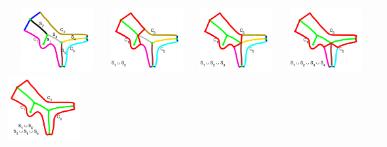 \begin{figure}[!ht]
\centering
{\footnotesize\textit{\textcolor{white}{a)}}}\includegraphics[width=0.17\textwidth]{figs/fish_s1.pdf}
{\footnotesize\textit{\textcolor{white}{a)}}}\includegraphics[width=0.17\textwidth]{figs/fish_s2.pdf}
{\footnotesize\textit{\textcolor{white}{a)}}}\includegraphics[width=0.17\textwidth]{figs/fish_s3.pdf}
{\footnotesize\textit{\textcolor{white}{a)}}}\includegraphics[width=0.17\textwidth]{figs/fish_s4.pdf}
{\footnotesize\textit{\textcolor{white}{a)}}}\includegraphics[width=0.17\textwidth]{figs/fish_s5.pdf}


\end{figure}

